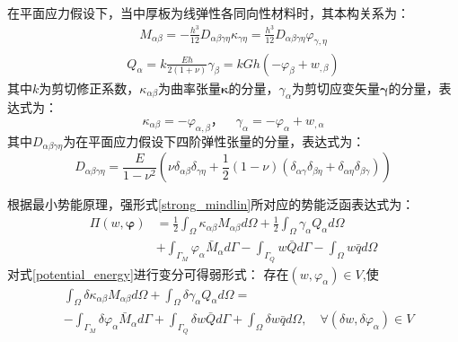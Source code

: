 在平面应力假设下，当中厚板为线弹性各同向性材料时，其本构关系为：
\begin{equation} 
    \begin{split}
    M_{\alpha \beta}=-\frac{h^3}{12}D_{\alpha \beta \gamma\eta}\kappa_{\gamma\eta}=\frac{h^3}{12}D_{\alpha \beta \gamma\eta}\varphi_{\gamma,\eta}
    \end{split}
\end{equation}
\begin{equation} 
    \begin{split}
    Q_{\alpha}=k\frac{Eh}{2(1+\nu)}\gamma_\beta=kGh(-\varphi_\beta+w_{,\beta})
    \end{split}
\end{equation}
其中$k$为剪切修正系数，$\kappa_{\alpha\beta}$为曲率张量$\pmb\kappa$的分量，$\gamma_\alpha$为剪切应变矢量$\pmb\gamma$的分量，表达式为：
\begin{equation} 
    \kappa_{\alpha\beta}=-\varphi_{\alpha,\beta}，\quad\gamma_\alpha=-\varphi_\alpha+w_{,\alpha}
\end{equation}
其中$D_{\alpha \beta \gamma\eta}$为在平面应力假设下四阶弹性张量的分量，表达式为：
\begin{equation} 
    D_{\alpha \beta \gamma\eta}=\frac{E}{1-\nu^2}(\nu\delta_{\alpha\beta}\delta_{\gamma\eta}+\frac{1}{2}(1-\nu)(\delta_{\alpha\gamma}\delta_{\beta\eta}+\delta_{\alpha\eta}\delta_{\beta\gamma}))
\end{equation}

根据最小势能原理，强形式\eqref{strong_mindlin}所对应的势能泛函表达式为： 
\begin{equation}\label{potential_energy}
    \begin{split} 
        \Pi(w,\boldsymbol{\varphi})&=\frac{1}{2}\int_{\Omega}\kappa_{\alpha\beta}M_{\alpha\beta}d\Omega+\frac{1}{2}\int_{\Omega}\gamma_{\alpha}Q_{\alpha}d\Omega\\
        &+\int_{\Gamma_{M}}\varphi_{\alpha}{\bar{M}_{\alpha}}d\Gamma-\int_{\Gamma_{Q}}{w}\bar {Q}d\Gamma-\int_{\Omega} w\bar{q}d\Omega
    \end{split}
\end{equation}
对式\eqref{potential_energy}进行变分可得弱形式：
存在$(w,\varphi_{\alpha})\in V$,使
\begin{equation}\label{weak_penalty_mindlin}
    \begin{split} 
        &\int_{\Omega}\delta\kappa_{\alpha\beta}M_{\alpha\beta}d\Omega+\int_{\Omega}\delta\gamma_{\alpha}Q_{\alpha}d\Omega=\\
        &-\int_{\Gamma_{M}}\delta\varphi_{\alpha}{\bar{M}_{\alpha}}d\Gamma+\int_{\Gamma_{Q}}{\delta{w}}\bar {Q}d\Gamma+\int_{\Omega} \delta{w}\bar{q}d\Omega,\quad \forall(\delta w,\delta\varphi_{\alpha}) \in V
    \end{split}
\end{equation}

